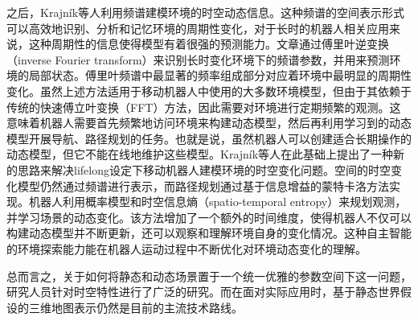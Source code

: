 之后，Krajník等人\cite{Krajn2014Spectral}利用频谱建模环境的时空动态信息。这种频谱的空间表示形式可以高效地识别、分析和记忆环境的周期性变化，对于长时的机器人相关应用来说，这种周期性的信息使得模型有着很强的预测能力。文章通过傅里叶逆变换（inverse Fourier transform）来识别长时变化环境下的频谱参数，并用来预测环境的局部状态。傅里叶频谱中最显著的频率组成部分对应着环境中最明显的周期性变化。虽然上述方法适用于移动机器人中使用的大多数环境模型，但由于其依赖于传统的快速傅立叶变换（FFT）方法，因此需要对环境进行定期频繁的观测。这意味着机器人需要首先频繁地访问环境来构建动态模型，然后再利用学习到的动态模型开展导航、路径规划的任务。也就是说，虽然机器人可以创建适合长期操作的动态模型，但它不能在线地维护这些模型。Krajník等人\cite{Krajnik2015Life}在此基础上提出了一种新的思路来解决lifelong设定下移动机器人建模环境的时空变化问题。空间的时空变化模型仍然通过频谱进行表示，而路径规划通过基于信息增益的蒙特卡洛方法实现。机器人利用概率模型和时空信息熵（spatio-temporal entropy）来规划观测，并学习场景的动态变化。该方法增加了一个额外的时间维度，使得机器人不仅可以构建动态模型并不断更新，还可以观察和理解环境自身的变化情况。这种自主智能的环境探索能力能在机器人运动过程中不断优化对环境动态变化的理解。

总而言之，关于如何将静态和动态场景置于一个统一优雅的参数空间下这一问题，研究人员针对时空特性进行了广泛的研究。而在面对实际应用时，基于静态世界假设的三维地图表示仍然是目前的主流技术路线。